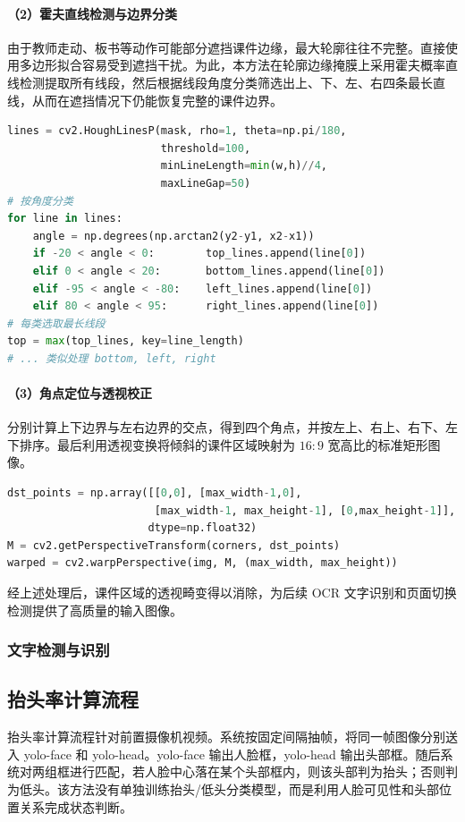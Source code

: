 \documentclass[12pt,hyperref,a4paper,UTF8]{ctexart}
\begin{document}
\paragraph{（2）霍夫直线检测与边界分类}

由于教师走动、板书等动作可能部分遮挡课件边缘，最大轮廓往往不完整。直接使用多边形拟合容易受到遮挡干扰。为此，本方法在轮廓边缘掩膜上采用霍夫概率直线检测提取所有线段，然后根据线段角度分类筛选出上、下、左、右四条最长直线，从而在遮挡情况下仍能恢复完整的课件边界。

\begin{lstlisting}[language=Python, caption=直线检测与角度分类]
lines = cv2.HoughLinesP(mask, rho=1, theta=np.pi/180,
                        threshold=100,
                        minLineLength=min(w,h)//4,
                        maxLineGap=50)
# 按角度分类
for line in lines:
    angle = np.degrees(np.arctan2(y2-y1, x2-x1))
    if -20 < angle < 0:        top_lines.append(line[0])
    elif 0 < angle < 20:       bottom_lines.append(line[0])
    elif -95 < angle < -80:    left_lines.append(line[0])
    elif 80 < angle < 95:      right_lines.append(line[0])
# 每类选取最长线段
top = max(top_lines, key=line_length)
# ... 类似处理 bottom, left, right
\end{lstlisting}

\paragraph{（3）角点定位与透视校正}

分别计算上下边界与左右边界的交点，得到四个角点，并按左上、右上、右下、左下排序。最后利用透视变换将倾斜的课件区域映射为 $16:9$ 宽高比的标准矩形图像。

\begin{lstlisting}[language=Python, caption=透视校正]
dst_points = np.array([[0,0], [max_width-1,0],
                       [max_width-1, max_height-1], [0,max_height-1]],
                      dtype=np.float32)
M = cv2.getPerspectiveTransform(corners, dst_points)
warped = cv2.warpPerspective(img, M, (max_width, max_height))
\end{lstlisting}

经上述处理后，课件区域的透视畸变得以消除，为后续 OCR 文字识别和页面切换检测提供了高质量的输入图像。

\subsubsection{文字检测与识别}

\subsection{抬头率计算流程}
抬头率计算流程针对前置摄像机视频。系统按固定间隔抽帧，将同一帧图像分别送入 yolo-face 和 yolo-head。yolo-face 输出人脸框，yolo-head 输出头部框。随后系统对两组框进行匹配，若人脸中心落在某个头部框内，则该头部判为抬头；否则判为低头。该方法没有单独训练抬头/低头分类模型，而是利用人脸可见性和头部位置关系完成状态判断。
\end{document}
